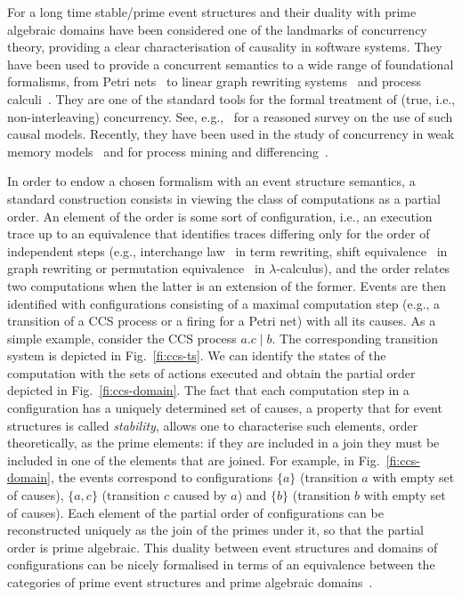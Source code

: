 For a long time stable/prime event structures and their duality with
prime algebraic domains have been considered one of the landmarks of
concurrency theory, providing a clear characterisation of causality in
software systems. They have been used to provide a concurrent
semantics to a wide range of foundational formalisms, from Petri
nets~\cite{NPW:PNES} to linear graph rewriting
systems~\cite{Handbook,Bal:PhD,Sch:RRSG} and process
calculi~\cite{Win:ESSCCS,VY:TESLP,BMM:ESSNC}. They are one of the
standard tools for the formal treatment of (true, i.e.,
non-interleaving) concurrency. See, e.g.,~\cite{Winskel11} for a
reasoned survey on the use of such causal models. Recently, they have
been used in the study of concurrency in weak memory
models~\cite{PS:CSRA,JR:OTRES,CV:GTARES} and for process mining and
differencing~\cite{DG:PMRES}.

In order to endow a chosen formalism with an event structure
semantics, a standard construction consists in viewing the class of
computations as a partial order. An element of the order is some sort
of configuration, i.e., an execution trace up to an equivalence that
identifies traces differing only for the order of independent steps
(e.g., interchange law~\cite{Mes92} in term rewriting, shift
equivalence~\cite{CMREHL:AAGT} in graph rewriting or permutation
equivalence~\cite{JJL80} in $\lambda$-calculus),
and the order relates two computations when
the latter is an extension of the former.
%
Events are then identified with configurations consisting
of a maximal computation step (e.g., a transition of a CCS process or
a firing for a Petri net) with all its causes.
%
As a simple example, consider the CCS process $a.c \mid b$. 
The corresponding transition system is depicted in Fig.~\ref{fi:ccs-ts}. We can identify the states of the computation with the sets of actions executed and obtain the partial order depicted in Fig.~\ref{fi:ccs-domain}.
%
The fact that each {computation step}  in a configuration has a uniquely determined
set of causes, a property that for event structures is called
\emph{stability}, allows one to characterise such elements, order
theoretically, as the prime elements: if they are included in a join
they must be included in one of the elements that are joined.
%
{For example}, in Fig.~\ref{fi:ccs-domain}, the events correspond to configurations $\{a\}$ (transition $a$ with
empty set of causes), $\{a,c\}$ (transition $c$ caused by $a$) and
$\{b\}$ (transition $b$ with empty set of causes).
%
Each element of the partial order of configurations can be
reconstructed uniquely as the join of the primes under it, so that the partial
order is prime algebraic.
%
This duality between event structures and domains of configurations 
can be nicely formalised in terms of an equivalence between the
categories of prime event structures and prime algebraic 
domains~\cite{NPW:PNES,Win:ES}.

